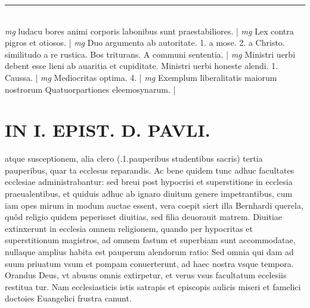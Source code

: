 \documentclass{article}
\begin{document}
\begin{pages}
\vspace{0.5cm}\noindent
\vspace{0.2cm}\rule{1cm}{0.2pt}\\ 
\hspace{0.2cm}\textit{mg}
\footnotesize ludacu bores animi corporis labonibus sunt praestabiliores. 
\normalsize| 
\hspace{0.2cm}\textit{mg}
\footnotesize Lex contra pigros et otiosos. 
\normalsize| 
\hspace{0.2cm}\textit{mg}
\footnotesize Duo argumenta ab autoritate. 1. a mose. 2. a Christo. similitudo a re rustica. Bos triturans. A communi sententia. 
\normalsize| 
\hspace{0.2cm}\textit{mg}
\footnotesize Ministri uerbi debent esse lieni ab auaritia et cupiditate. Ministri uerbi honeste alendi. 1. Caussa. 
\normalsize| 
\hspace{0.2cm}\textit{mg}
\footnotesize Mediocritas optima. 4. 
\normalsize| 
\hspace{0.2cm}\textit{mg}
\footnotesize Exemplum liberalitatis maiorum nostrorum Quatuorpartiones eleemosynarum. 
\normalsize| 
\section*{IN I. EPIST. D. PAVLI. }
\marginpar{[ p.114 ]}\pstart atque susceptionem, alia clero (.1.pauperibus studentibus sacris) tertia pauperibus, quar ta ecclesus reparandis. Ac bene quidem tunc adhuc facultates ecclesiae administrabantur: sed breui post hypocrisi et superstitione in ecclesia praeualentibus, et quiduis adhuc ab ignaro diuitum genere impetrantibus, cum iam opes mirum in modum auctae essent, vera coepit siert illa Bernhardi querela, quôd religio quidem peperisset diuitias, sed filia deuorauit matrem. Diuitiae extinxerunt in ecclesia omnem religionem, quando per hypocritas et superstitionum magistros, ad omnem fastum et superbiam sunt accommodatae, nullaque amplius habita est pauperum alendorum ratio: Sed omnia qui dam ad suum priuatum vsum et pompam conuerterunt, ad haec nostra vsque tempora. Orandus Deus, vt abusus omnis extirpetur, et verus vsus facultatum ecelesiis restitua tur. Nam ecclesiasticis istis satrapis et episcopis aulicis miseri et famelici doctoies Euangelici frustra canunt.  \pend
{}
{}

\end{pages}
\end{document}
